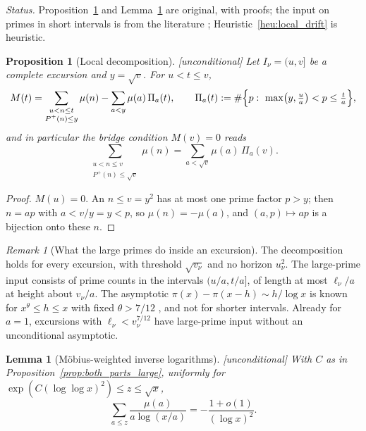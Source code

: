 \documentclass[11pt]{amsart}
\numberwithin{equation}{section}
\theoremstyle{plain}
\newtheorem{proposition}[theorem]{Proposition}
\newtheorem{lemma}[theorem]{Lemma}
\theoremstyle{definition}
\theoremstyle{remark}
\newtheorem{remark}[theorem]{Remark}
\newcommand{\Pp}{P^{+}}
\begin{document}
\noindent\emph{Status.} Proposition~\ref{prop:local_large_prime} and
Lemma~\ref{lem:inverse_log_sum} are original, with proofs; the input on
primes in short intervals is from the literature \cite{Huxley1972};
Heuristic~\ref{heu:local_drift} is heuristic.

\begin{proposition}[Local decomposition]
\label{prop:local_large_prime}
\emph{[unconditional]} Let $I_\nu=(u,v]$ be a complete excursion and
$y=\sqrt v$. For $u<t\le v$,
\begin{equation}
\label{eq:local_split}
  M(t)=\sum_{\substack{u<n\le t\\ \Pp(n)\le y}}\mu(n)
  -\sum_{a<y}\mu(a)\,\Pi_a(t),\qquad
  \Pi_a(t):=\#\Bigl\{p:\ \max\bigl(y,\tfrac ua\bigr)<p\le\tfrac ta\Bigr\},
\end{equation}
and in particular the bridge condition $M(v)=0$ reads
\begin{equation}
\label{eq:local_bridge}
  \sum_{\substack{u<n\le v\\ \Pp(n)\le\sqrt v}}\mu(n)
  =\sum_{a<\sqrt v}\mu(a)\,\Pi_a(v).
\end{equation}
\end{proposition}

\begin{proof}
$M(u)=0$. An $n\le v=y^2$ has at most one prime factor $p>y$; then
$n=ap$ with $a<v/y=y<p$, so $\mu(n)=-\mu(a)$, and $(a,p)\mapsto ap$ is a
bijection onto these $n$.
\end{proof}

\begin{remark}[What the large primes do inside an excursion]
\label{rem:local_meaning}
The decomposition holds for every excursion, with threshold $\sqrt{v_\nu}$
and no horizon $u_\nu^2$. The large-prime input consists of prime counts in
the intervals $(u/a,t/a]$, of length at most $\ell_\nu/a$ at height about
$v_\nu/a$. The asymptotic $\pi(x)-\pi(x-h)\sim h/\log x$ is known for
$x^\theta\le h\le x$ with fixed $\theta>7/12$ \cite{Huxley1972}, and not for
shorter intervals. Already for $a=1$, excursions with
$\ell_\nu<v_\nu^{7/12}$ have large-prime input without an unconditional
asymptotic.
\end{remark}

\begin{lemma}[Möbius-weighted inverse logarithms]
\label{lem:inverse_log_sum}
\emph{[unconditional]} With $C$ as in
Proposition~\ref{prop:both_parts_large}, uniformly for
$\exp(C(\log\log x)^2)\le z\le\sqrt x$,
\begin{equation}
\label{eq:inverse_log_sum}
  \sum_{a\le z}\frac{\mu(a)}{a\log(x/a)}=-\frac{1+o(1)}{(\log x)^2}.
\end{equation}
\end{lemma}
\end{document}
